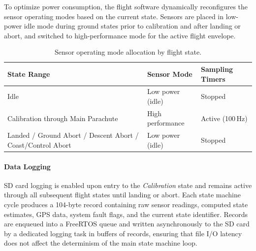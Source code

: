 To optimize power consumption, the flight software dynamically reconfigures the sensor operating modes based on the current state. Sensors are placed in low-power idle mode during ground states prior to calibration and after landing or abort, and switched to high-performance mode for the active flight envelope.

\begin{table}[H]
\centering
\caption{Sensor operating mode allocation by flight state.}
\label{tab:sensor_modes}
\begin{tabularx}{\textwidth}{l l X}
\toprule
\textbf{State Range} & \textbf{Sensor Mode} & \textbf{Sampling Timers} \\
\midrule
Idle & Low power (idle) & Stopped \\
Calibration through Main Parachute & High performance & Active (100\,Hz) \\
Landed / Ground Abort / Descent Abort / Coast/Control Abort & Low power (idle) & Stopped \\
\bottomrule
\end{tabularx}
\end{table}

\paragraph{Data Logging}

SD card logging is enabled upon entry to the \emph{Calibration} state and remains active through all subsequent flight states until landing or abort. Each state machine cycle produces a 104-byte record containing raw sensor readings, computed state estimates, GPS data, system fault flags, and the current state identifier. Records are enqueued into a FreeRTOS queue and written asynchronously to the SD card by a dedicated logging task in buffers of  records, ensuring that file I/O latency does not affect the determinism of the main state machine loop.
